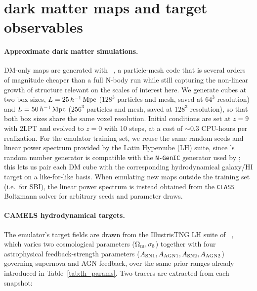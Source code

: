 \section{dark matter maps and target observables}
\label{sec:emu_dmmaps}

\paragraph{Approximate dark matter simulations.}
DM-only maps are generated with \FastPM~\citep{feng_fastpm_2016}, a particle-mesh
code that is several orders of magnitude cheaper than a full N-body run
while still capturing the non-linear growth of structure relevant on the
scales of interest here. We generate cubes at two box sizes, $L=25\,h^{-1}\,\mathrm{Mpc}$
($128^3$ particles and mesh, saved at $64^3$ resolution) and $L=50\,h^{-1}\,\mathrm{Mpc}$
($256^3$ particles and mesh, saved at $128^3$ resolution), so that both box
sizes share the same voxel resolution. Initial conditions are set at $z=9$
with 2LPT and evolved to $z=0$ with 10 \FastPM steps, at a cost of
$\sim 0.3$ CPU-hours per realization. For the emulator training set, we
reuse the same random seeds and linear power spectrum provided by the
\CAMELS Latin Hypercube (LH) suite, since \FastPM's random number generator
is compatible with the \texttt{N-GenIC} generator used by \CAMELS; this lets
us pair each \FastPM DM cube with the corresponding hydrodynamical galaxy/HI
target on a like-for-like basis. When emulating new maps outside the
training set (i.e.\ for SBI), the linear power spectrum is instead obtained
from the \texttt{CLASS} Boltzmann solver for arbitrary seeds and parameter
draws.

\paragraph{CAMELS hydrodynamical targets.}
The emulator's target fields are drawn from the IllustrisTNG LH suite of
\CAMELS~\citep{nelson2021illustristngsimulationspublicdata}, which varies two
cosmological parameters ($\Omega_\mathrm{m}, \sigma_8$) together with four astrophysical
feedback-strength parameters
($A_{\rm SN1}, A_{\rm AGN1}, A_{\rm SN2}, A_{\rm AGN2}$) governing supernova
and AGN feedback, over the same prior ranges already introduced in
Table~\ref{tab:lh_params}. Two tracers are extracted from each snapshot:

